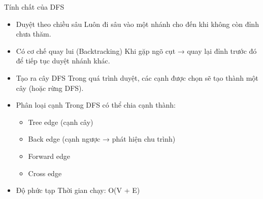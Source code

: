 \documentclass{beamer}
\newcommand{\hlblue}[1]{\textcolor{myblue}{#1}}
\newcommand{\hlgreen}[1]{\textcolor{mygreen}{#1}}
\newcommand{\hlred}[1]{\textcolor{myred}{#1}}
\newcommand{\hlpurple}[1]{\textcolor{mypurple}{#1}}
\newcommand{\hlorange}[1]{\textcolor{myorange}{#1}}
\begin{document}
\begin{frame}{Tính chất của DFS}

\begin{itemize}

\item \hlblue{Duyệt theo chiều sâu}  
Luôn đi sâu vào một nhánh cho đến khi không còn đỉnh chưa thăm.

\vspace{5pt}

\item \hlgreen{Có cơ chế quay lui (Backtracking)}  
Khi gặp ngõ cụt → quay lại đỉnh trước đó để tiếp tục duyệt nhánh khác.

\vspace{5pt}

\item \hlpurple{Tạo ra cây DFS}  
Trong quá trình duyệt, các cạnh được chọn sẽ tạo thành một cây (hoặc rừng DFS).

\vspace{5pt}

\item \hlorange{Phân loại cạnh}  
Trong DFS có thể chia cạnh thành:
\begin{itemize}
\item Tree edge (cạnh cây)
\item Back edge (cạnh ngược → phát hiện chu trình)
\item Forward edge
\item Cross edge
\end{itemize}

\vspace{5pt}

\item \hlred{Độ phức tạp}  
Thời gian chạy: O(V + E)

\end{itemize}

\end{frame}
\end{document}
